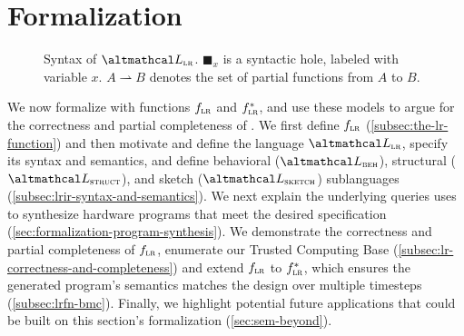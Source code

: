 \section{Formalization}
\label{sec:formalization}

\newsavebox\boxlet
\newsavebox\boxassign
\newsavebox\boxin
\newsavebox\boxreg
\newsavebox\boxprim
{}
\savebox{\boxassign}{\lstinline[language=thelang]!:=!}

\newcommand{\Prim}[0]{\lstinline[language=thelang]{Prim}\xspace}

\newcommand{\Reg}[0]{\lstinline[language=thelang]{Reg}\xspace}

\newcommand{\Let}[0]{\lstinline[language=thelang]{let}\xspace}


\begin{figure*}

\caption{Syntax of $\UberLang$. $\blacksquare_x$ is a syntactic hole, labeled with variable $x$. $A \rightharpoonup B$ denotes the set of partial functions from $A$ to $B$.}
\label{fig:syntax}
\end{figure*}

% 


We now formalize \lr{} 
  with functions $\text{$f_{\textsc{lr}}$}$ and
  $\text{$f_{\textsc{lr}}^{*}$}$,
  and use these models
  to argue for the correctness
  and partial completeness of \lr{}. 
We first define  
  $\text{$f_{\textsc{lr}}$}$ (\cref{subsec:the-lr-function}) and then 
motivate and define
  the language $\UberLang{}$,  
  specify its syntax and semantics,
  and define behavioral ($\SpecLang$), structural ($\ImplLang$), and sketch ($\SketchLang$) sublanguages (\cref{subsec:lrir-syntax-and-semantics}).
%
{%
We next explain the
  underlying queries
  \lr{} uses to
  synthesize hardware programs
  that meet the desired specification
} (\cref{sec:formalization-program-synthesis}).
  We demonstrate the correctness
  and partial completeness of $\text{$f_{\textsc{lr}}$}$,
  enumerate our Trusted Computing Base
  (\cref{subsec:lr-correctness-and-completeness}) and 
extend $\text{$f_{\textsc{lr}}$}$ to $\text{$f_{\textsc{lr}}^{*}$}$,
    which ensures the generated program's
    semantics matches the design over multiple
    timesteps (\cref{subsec:lrfn-bmc}).
%
Finally,
 we highlight potential future
 applications that could be
 built on this section's formalization
 (\cref{sec:sem-beyond}).
 

